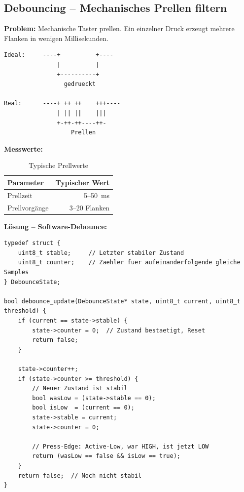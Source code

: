 \subsection{Debouncing – Mechanisches Prellen filtern}

\textbf{Problem:} Mechanische Taster prellen. Ein einzelner Druck erzeugt mehrere Flanken in wenigen Millisekunden.

\begin{lstlisting}[style=wrap,numbers=none]
Ideal:     ----+          +----
               |          |
               +----------+
                 gedrueckt

Real:      ----+ ++ ++    +++----
               | || ||    |||
               +-++-++----++-
                   Prellen
\end{lstlisting}

\textbf{Messwerte:}

\begin{table}[htbp]
\centering
\begin{tabular}{@{}lr@{}}
\toprule
\textbf{Parameter} & \textbf{Typischer Wert} \\
\midrule
Prellzeit     & 5–\SI{50}{\milli\second} \\
Prellvorgänge & 3–20 Flanken \\
\bottomrule
\end{tabular}
\caption{Typische Prellwerte}
\label{tab:prellwerte}
\end{table}

\textbf{Lösung – Software-Debounce:}

\begin{lstlisting}[style=arduino]
typedef struct {
    uint8_t stable;     // Letzter stabiler Zustand
    uint8_t counter;    // Zaehler fuer aufeinanderfolgende gleiche Samples
} DebounceState;

bool debounce_update(DebounceState* state, uint8_t current, uint8_t threshold) {
    if (current == state->stable) {
        state->counter = 0;  // Zustand bestaetigt, Reset
        return false;
    }

    state->counter++;
    if (state->counter >= threshold) {
        // Neuer Zustand ist stabil
        bool wasLow = (state->stable == 0);
        bool isLow  = (current == 0);
        state->stable = current;
        state->counter = 0;

        // Press-Edge: Active-Low, war HIGH, ist jetzt LOW
        return (wasLow == false && isLow == true);
    }
    return false;  // Noch nicht stabil
}
\end{lstlisting}

